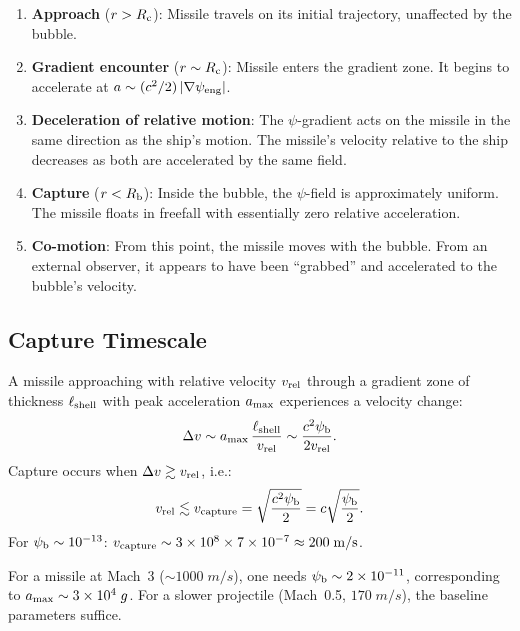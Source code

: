 \documentclass[12pt,aps,prd,superscriptaddress,nofootinbib]{revtex4-2}
\newcommand{\psib}{\psi_{\rm b}}
\newcommand{\Rb}{R_{\rm b}}
\newcommand{\Rc}{R_{\rm c}}
\newcommand{\Lshell}{\ell_{\rm shell}}
\begin{document}
\begin{enumerate}
\item \textbf{Approach} ($r > \Rc$): Missile travels on its initial
trajectory, unaffected by the bubble.

\item \textbf{Gradient encounter} ($r \sim \Rc$): Missile enters the
gradient zone. It begins to accelerate at
$a \sim (c^2/2)\,|\nabla\psi_{\rm eng}|$.

\item \textbf{Deceleration of relative motion}: The $\psi$-gradient
acts on the missile in the same direction as the ship's motion.
The missile's velocity relative to the ship decreases as both
are accelerated by the same field.

\item \textbf{Capture} ($r < \Rb$): Inside the bubble, the
$\psi$-field is approximately uniform. The missile floats in
freefall with essentially zero relative acceleration.

\item \textbf{Co-motion}: From this point, the missile moves with
the bubble. From an external observer, it appears to have been
``grabbed'' and accelerated to the bubble's velocity.
\end{enumerate}

\subsection{Capture Timescale}

A missile approaching with relative velocity $v_{\rm rel}$ through
a gradient zone of thickness $\Lshell$ with peak acceleration
$a_{\rm max}$ experiences a velocity change:
\begin{equation}
\Delta v \sim a_{\rm max}\,\frac{\Lshell}{v_{\rm rel}}
\sim \frac{c^2\psib}{2v_{\rm rel}}.
\end{equation}
Capture occurs when $\Delta v \gtrsim v_{\rm rel}$, i.e.:
\begin{equation}
v_{\rm rel} \lesssim v_{\rm capture}
= \sqrt{\frac{c^2\psib}{2}} = c\sqrt{\frac{\psib}{2}}.
\end{equation}
For $\psib \sim 10^{-13}$:
$v_{\rm capture} \sim 3\times 10^8 \times 7\times 10^{-7}
\approx 200\;\si{m/s}$.

For a missile at Mach~3 ($\sim 1000\;\si{m/s}$), one needs
$\psib \sim 2\times 10^{-11}$, corresponding to
$a_{\rm max} \sim 3\times 10^4\;g$. For a slower projectile
(Mach~0.5, $170\;\si{m/s}$), the baseline parameters suffice.
\end{document}
